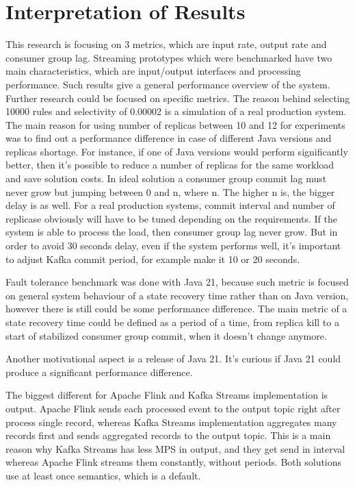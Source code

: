 \section{Interpretation of Results}\label{sec:interpretation-of-results}
This research is focusing on 3 metrics, which are input rate, output rate and consumer group lag.
Streaming prototypes which were benchmarked have two main characteristics, which are
input/output interfaces and processing performance.
Such results give a general performance overview of the system.
Further research could be focused on specific metrics.
The reason behind selecting 10000 rules and selectivity of 0.00002 is a
simulation of a real production system.
The main reason for using number of replicas between 10 and 12 for experiments
was to find out a performance difference in case of different Java versions and replicas shortage.
For instance, if one of Java versions would perform significantly better, then
it's possible to reduce a number of replicas for the same workload and save
solution costs.
In ideal solution a consumer group commit lag must never grow but
jumping between 0 and n, where n.
The higher n is, the bigger delay is as well.
For a real production systems, commit interval and number of replicase
obviously will have to be tuned depending on the requirements.
If the system is able to process the load, then consumer group lag never grow.
But in order to avoid 30 seconds delay, even if the system performs well,
it's important to adjust Kafka commit period, for example make it 10 or 20 seconds.

Fault tolerance benchmark was done with Java 21, because such metric is
focused on general system behaviour of a state recovery time rather than on Java version,
however there is still could be some performance difference.
The main metric of a state recovery time could be defined as a period of a time,
from replica kill to a start of stabilized consumer group commit, when it doesn't
change anymore.

Another motivational aspect is a release of Java 21.
It's curious if Java 21 could produce a significant performance difference.

The biggest different for Apache Flink and Kafka Streams implementation is output.
Apache Flink sends each processed event to the output topic right after process single record,
whereas Kafka Streams implementation aggregates many records first and sends aggregated
records to the output topic.
This is a main reason why Kafka Streams has less MPS in output, and they get send
in interval whereas Apache Flink streams them constantly, without periods.
Both solutions use at least once semantics, which is a default.

